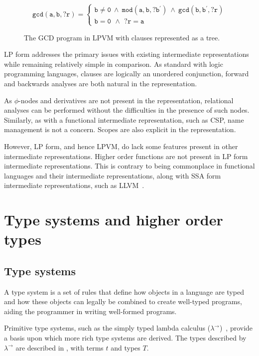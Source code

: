 \begin{figure}[ht]
  \begin{equation*}
    \mathtt{gcd(a, b, ?r) = }\left\{
		\begin{array}{l}
      \mathtt{b \neq 0\ \land\ mod(a, b, ?b^\prime)\ \land\ gcd(b, b^\prime, ?r)} \\
      \mathtt{b = 0\,\ \land\,\ ?r = a}
		\end{array}
    \right.
  \end{equation*}
  \caption{The GCD program in LPVM with clauses represented as a tree.}
  \label{fig:gcd-lpvm-tree}
\end{figure}

LP form addresses the primary issues with existing intermediate representations while remaining relatively simple in comparison. As standard with logic programming languages, clauses are logically an unordered conjunction, forward and backwards analyses are both natural in the representation.

As $\phi$-nodes and derivatives are not present in the representation, relational analyses can be performed without the difficulties in the presence of such nodes. Similarly, as with a functional intermediate representation, such as CSP, name management is not a concern. Scopes are also explicit in the representation.

However, LP form, and hence LPVM, do lack some features present in other intermediate representations. Higher order functions are not present in LP form intermediate representations. This is contrary to being commonplace in functional languages and their intermediate representations, along with SSA form intermediate representations, such as LLVM~\cite{lattner2004llvm}.

\section{Type systems and higher order types}
\label{sec:types}

\subsection{Type systems}

A type system is a set of rules that define how objects in a language are typed and how these objects can legally be combined to create well-typed programs, aiding the programmer in writing well-formed programs. 

Primitive type systems, such as the simply typed lambda calculus ($\lambda^\rightarrow$)~\cite{church1940formulation}, provide a basis upon which more rich type systems are derived. The types described by $\lambda^\rightarrow$ are described in , with terms $t$ and types $T$. 

